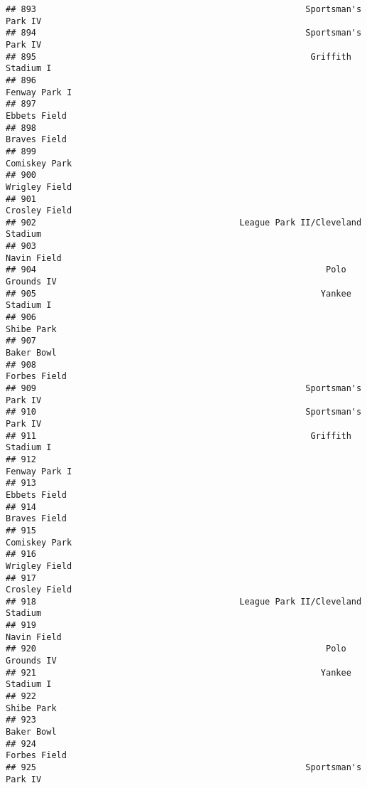 \documentclass[]{article}
\begin{document}
\begin{verbatim}
## 893                                                     Sportsman's Park IV
## 894                                                     Sportsman's Park IV
## 895                                                      Griffith Stadium I
## 896                                                           Fenway Park I
## 897                                                            Ebbets Field
## 898                                                            Braves Field
## 899                                                           Comiskey Park
## 900                                                           Wrigley Field
## 901                                                           Crosley Field
## 902                                        League Park II/Cleveland Stadium
## 903                                                             Navin Field
## 904                                                         Polo Grounds IV
## 905                                                        Yankee Stadium I
## 906                                                              Shibe Park
## 907                                                              Baker Bowl
## 908                                                            Forbes Field
## 909                                                     Sportsman's Park IV
## 910                                                     Sportsman's Park IV
## 911                                                      Griffith Stadium I
## 912                                                           Fenway Park I
## 913                                                            Ebbets Field
## 914                                                            Braves Field
## 915                                                           Comiskey Park
## 916                                                           Wrigley Field
## 917                                                           Crosley Field
## 918                                        League Park II/Cleveland Stadium
## 919                                                             Navin Field
## 920                                                         Polo Grounds IV
## 921                                                        Yankee Stadium I
## 922                                                              Shibe Park
## 923                                                              Baker Bowl
## 924                                                            Forbes Field
## 925                                                     Sportsman's Park IV

\end{verbatim}
\end{document}
